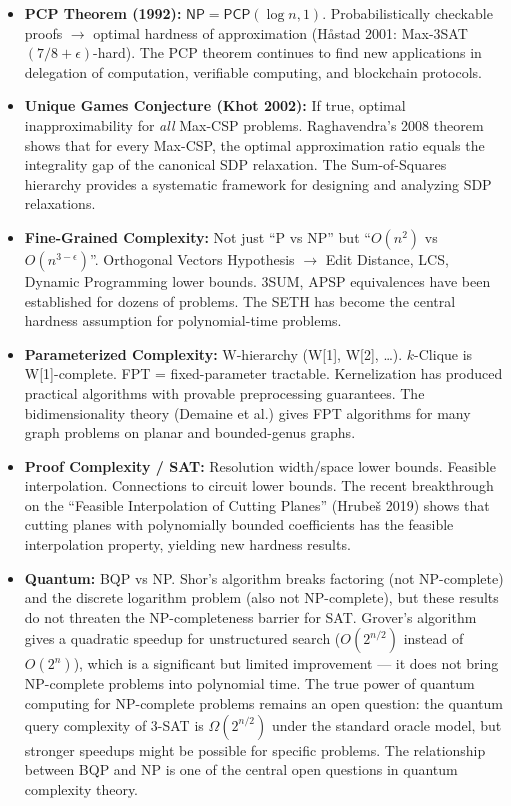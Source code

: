 \begin{itemize}
\item \textbf{PCP Theorem (1992):} $\mathsf{NP} = \mathsf{PCP}(\log n, 1)$. Probabilistically checkable proofs $\to$ optimal hardness of approximation (Håstad 2001: Max-3SAT $(7/8+\epsilon)$-hard). The PCP theorem continues to find new applications in delegation of computation, verifiable computing, and blockchain protocols.

\item \textbf{Unique Games Conjecture (Khot 2002):} If true, optimal inapproximability for \emph{all} Max-CSP problems. Raghavendra's 2008 theorem shows that for every Max-CSP, the optimal approximation ratio equals the integrality gap of the canonical SDP relaxation. The Sum-of-Squares hierarchy provides a systematic framework for designing and analyzing SDP relaxations.

\item \textbf{Fine-Grained Complexity:} Not just ``P vs NP'' but ``$O(n^2)$ vs $O(n^{3-\epsilon})$''. Orthogonal Vectors Hypothesis $\to$ Edit Distance, LCS, Dynamic Programming lower bounds. 3SUM, APSP equivalences have been established for dozens of problems. The SETH has become the central hardness assumption for polynomial-time problems.

\item \textbf{Parameterized Complexity:} W-hierarchy (W[1], W[2], \dots). $k$-Clique is W[1]-complete. FPT = fixed-parameter tractable. Kernelization has produced practical algorithms with provable preprocessing guarantees. The bidimensionality theory (Demaine et al.) gives FPT algorithms for many graph problems on planar and bounded-genus graphs.

\item \textbf{Proof Complexity / SAT:} Resolution width/space lower bounds. Feasible interpolation. Connections to circuit lower bounds. The recent breakthrough on the ``Feasible Interpolation of Cutting Planes'' (Hrubeš 2019) shows that cutting planes with polynomially bounded coefficients has the feasible interpolation property, yielding new hardness results.

\item \textbf{Quantum:} BQP vs NP. Shor's algorithm breaks factoring (not NP-complete) and the discrete logarithm problem (also not NP-complete), but these results do not threaten the NP-completeness barrier for SAT. Grover's algorithm gives a quadratic speedup for unstructured search ($O(2^{n/2})$ instead of $O(2^n)$), which is a significant but limited improvement — it does not bring NP-complete problems into polynomial time. The true power of quantum computing for NP-complete problems remains an open question: the quantum query complexity of 3-SAT is $\Omega(2^{n/2})$ under the standard oracle model, but stronger speedups might be possible for specific problems. The relationship between BQP and NP is one of the central open questions in quantum complexity theory.


\end{itemize}
